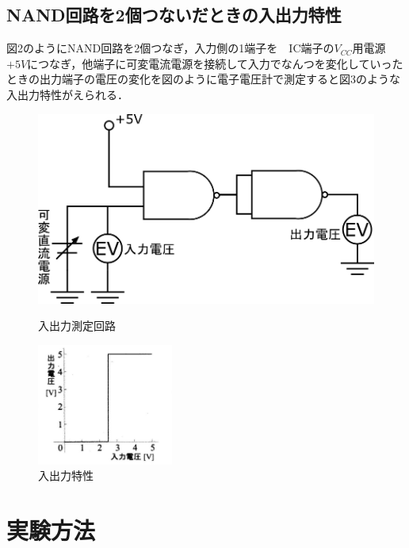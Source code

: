 \documentclass[10pt, a4j, dvipdfmx]{jarticle}
\begin{document}
\subsection{NAND回路を2個つないだときの入出力特性}
図2のようにNAND回路を2個つなぎ，入力側の1端子を　IC端子の$V_{CC}$用電源$+5V$につなぎ，他端子に可変電流電源を接続して入力でなんつを変化していったときの出力端子の電圧の変化を図のように電子電圧計で測定すると図3のような入出力特性がえられる．
\begin{figure}[H]
  \begin{minipage}{0.5\hsize}
    \centering
   	\includegraphics[width=\hsize]{images/text/fig2.png}
    \caption{入出力測定回路}
  \end{minipage}
  \begin{minipage}{0.5\hsize}
    \centering
	\includegraphics[height=40mm]{images/text/fig3.png}
    \caption{入出力特性}
  \end{minipage}
\end{figure}

\section{実験方法}
\end{document}
